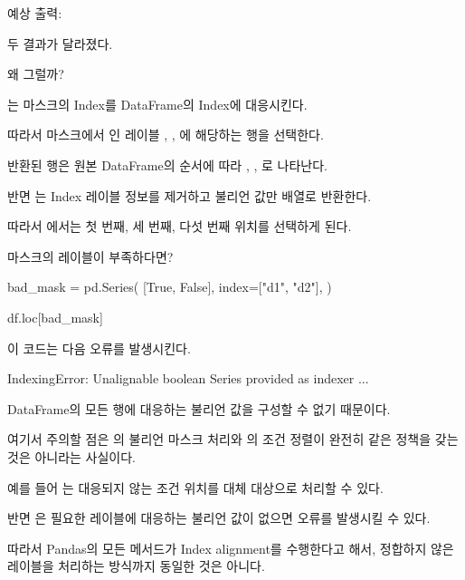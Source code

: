 예상 출력:

\begin{dhkzsh}
['d2', 'd3', 'd5']
['d1', 'd3', 'd5']
\end{dhkzsh}

두 결과가 달라졌다.

왜 그럴까?

는 마스크의 Index를 DataFrame의 Index에 대응시킨다.

따라서 마스크에서 인 레이블 , , 에 해당하는 행을 선택한다.

반환된 행은 원본 DataFrame의 순서에 따라 , , 로 나타난다.

반면 는 Index 레이블 정보를 제거하고 불리언 값만 배열로 반환한다.

\begin{dhkzsh}
\end{dhkzsh}

따라서 에서는 첫 번째, 세 번째, 다섯 번째 위치를 선택하게 된다.

\begin{dhknote}
\begin{dhksmry}[centered]
마스크의 레이블이 부족하다면?
\end{dhksmry}
\end{dhknote}

\begin{dhkcode}
bad_mask = pd.Series(
    [True, False],
    index=["d1", "d2"],
)

df.loc[bad_mask]
\end{dhkcode}

이 코드는 다음 오류를 발생시킨다.

\begin{dhkzsh}
IndexingError: Unalignable boolean Series provided as indexer ...
\end{dhkzsh}

DataFrame의 모든 행에 대응하는 불리언 값을 구성할 수 없기 때문이다.

여기서 주의할 점은 의 불리언 마스크 처리와 의 조건 정렬이 완전히 같은 정책을 갖는 것은 아니라는 사실이다.

예를 들어 는 대응되지 않는 조건 위치를 대체 대상으로 처리할 수 있다.

반면 은 필요한 레이블에 대응하는 불리언 값이 없으면 오류를 발생시킬 수 있다.

따라서 Pandas의 모든 메서드가 Index alignment를 수행한다고 해서, 정합하지 않은 레이블을 처리하는 방식까지 동일한 것은 아니다.


